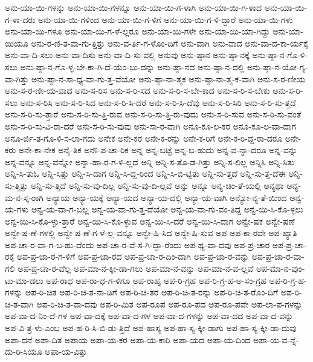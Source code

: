 {ಅನು-ಯಾ-ಯಿ-ಗಳನ್ನು
ಅನು-ಯಾ-ಯಿ-ಗಳನ್ನೂ
ಅನು-ಯಾ-ಯಿ-ಗ-ಳಾಗಿ
ಅನು-ಯಾ-ಯಿ-ಗ-ಳಾದ
ಅನು-ಯಾ-ಯಿ-ಗ-ಳಾ-ದರು
ಅನು-ಯಾ-ಯಿ-ಗಳಿಂದ
ಅನು-ಯಾ-ಯಿ-ಗ-ಳಿಗೆ
ಅನು-ಯಾ-ಯಿ-ಗ-ಳಿ-ದ್ದಾರೆ
ಅನು-ಯಾ-ಯಿ-ಗಳು
ಅನು-ಯಾ-ಯಿ-ಗಳೂ
ಅನು-ಯಾ-ಯಿ-ಗ-ಳೆ-ಲ್ಲರೂ
ಅನು-ಯಾ-ಯಿ-ಗಳೇ
ಅನು-ಯಾ-ಯಿ-ಯಾ-ಗಿದ್ದು
ಅನು-ಯಾ-ಯಿಯೂ
ಅನು-ರ-ಣಿ-ತ-ವಾ-ಗು-ತ್ತಿತ್ತು
ಅನು-ವ-ರ್ತಿ-ಗ-ಳೊಂ-ದಿಗೆ
ಅನು-ವಾಗಿ
ಅನು-ವಾದ
ಅನು-ವಾ-ದ-ಕಾ-ರ್ಯಕ್ಕೆ
ಅನು-ವಾ-ದಿ-ಸಲು
ಅನು-ವಾ-ದಿಸು
ಅನು-ವಾ-ದಿ-ಸು-ವಲ್ಲಿ
ಅನುವು
ಅನು-ಷ್ಠಾನ
ಅನು-ಷ್ಠಾ-ನಕ್ಕೆ
ಅನು-ಷ್ಠಾ-ನ-ಗೊ-ಳಿ-ಸಲು
ಅನು-ಷ್ಠಾ-ನ-ಗೊ-ಳ್ಳ-ಬೇ-ಕಾ-ಗಿ-ದೆ-ಯೆಂ-ಬು-ದನ್ನು
ಅನು-ಷ್ಠಾ-ನದ
ಅನು-ಷ್ಠಾ-ನ-ದಲ್ಲಿ
ಅನು-ಷ್ಠಾ-ನ-ಯೋ-ಗ್ಯ-ವಾ-ಗಿತ್ತು
ಅನು-ಷ್ಠಾ-ನ-ಸಾ-ಧ್ಯ-ವಾ-ಗು-ತ್ತ-ವೆಯೋ
ಅನು-ಷ್ಠಾ-ನಾ-ತ್ಮಕ
ಅನು-ಷ್ಠಾ-ನಾ-ತ್ಮ-ಕ-ವಾಗಿ
ಅನು-ಸ-ರ-ಣೀಯ
ಅನು-ಸ-ರ-ಣೀ-ಯ-ವಾದ
ಅನು-ಸ-ರಿಸ
ಅನು-ಸ-ರಿ-ಸದ
ಅನು-ಸ-ರಿ-ಸ-ಬೇ-ಕಾದ
ಅನು-ಸ-ರಿ-ಸ-ಬೇಕು
ಅನು-ಸ-ರಿ-ಸಲು
ಅನು-ಸ-ರಿಸಿ
ಅನು-ಸ-ರಿ-ಸಿದ
ಅನು-ಸ-ರಿ-ಸಿ-ದರೆ
ಅನು-ಸ-ರಿ-ಸಿ-ದೆವು
ಅನು-ಸ-ರಿ-ಸಿರಿ
ಅನು-ಸ-ರಿ-ಸು-ತ್ತದೆ
ಅನು-ಸ-ರಿ-ಸು-ತ್ತಾರೆ
ಅನು-ಸ-ರಿ-ಸು-ತ್ತಿ-ರುವ
ಅನು-ಸ-ರಿ-ಸು-ತ್ತಿ-ರು-ವುದು
ಅನು-ಸ-ರಿ-ಸುವ
ಅನು-ಸ-ರಿ-ಸು-ವಂತೆ
ಅನು-ಸ-ರಿ-ಸು-ವಿ-ರಾ-ದರೆ
ಅನು-ಸ-ರಿ-ಸು-ವುವು
ಅನು-ಸಾ-ರ-ವಾಗಿ
ಅನೂ-ಕೂ-ಲ-ಕರ
ಅನೂ-ಕೂ-ಲ-ವಾ-ದಾಗ
ಅನೂ-ರ್ಜಿ-ತ-ಗೊ-ಳಿ-ಸ-ಲಾ-ಗದು
ಅನೇಕ
ಅನೇ-ಕರ
ಅನೇ-ಕ-ರನ್ನು
ಅನೇ-ಕ-ರಿಗೆ
ಅನೇ-ಕ-ರಿ-ದ್ದ-ರಾ-ದರೂ
ಅನೇ-ಕರು
ಅನೇ-ಕಾ-ನೇಕ
ಅನೈ-ತಿಕ
ಅನೌ-ಪ-ಚಾ-ರಿಕ
ಅನ್ನ
ಅನ್ನ-ಬಟ್ಟೆ
ಅನ್ನ-ಬ-ಹುದು
ಅನ್ನ-ವ-ನ್ನಾ-ದರೂ
ಅನ್ನ-ವನ್ನು
ಅನ್ನ-ವನ್ನೂ
ಅನ್ನ-ವನ್ನೋ
ಅನ್ನಾ-ಹಾ-ರ-ಗ-ಳಿ-ಲ್ಲದೆ
ಅನ್ನಿ
ಅನ್ನಿ-ಸ-ತೊ-ಡ-ಗಿತ್ತು
ಅನ್ನಿ-ಸ-ಲಿಲ್ಲ
ಅನ್ನಿಸಿ
ಅನ್ನಿ-ಸಿತು
ಅನ್ನಿ-ಸಿ-ತುಓ
ಅನ್ನಿ-ಸಿತ್ತು
ಅನ್ನಿ-ಸಿ-ದಾಗ
ಅನ್ನಿ-ಸಿ-ದ್ದ-ರಿಂದ
ಅನ್ನಿ-ಸಿ-ಬಿ-ಟ್ಟಿತು
ಅನ್ನಿ-ಸು-ತ್ತದೆ
ಅನ್ನಿ-ಸು-ತ್ತ-ದೆಈ
ಅನ್ನಿ-ಸು-ತ್ತಿತ್ತು
ಅನ್ನಿ-ಸು-ತ್ತಿದೆ
ಅನ್ನಿ-ಸು-ವು-ದಿಲ್ಲ
ಅನ್ನಿ-ಸು-ವು-ದಿ-ಲ್ಲವೆ
ಅನ್ನು
ಅನ್ನೂ
ಅನ್ಯ-ಚಿಂ-ತೆ-ಯಲ್ಲಿ
ಅನ್ಯಥಾ
ಅನ್ಯ-ಮ-ನ-ಸ್ಕ-ರಾಗಿ
ಅನ್ಯಾಯ
ಅನ್ಯಾ-ಯಕ್ಕೆ
ಅನ್ಯಾ-ಯದ
ಅನ್ಯಾ-ಯ-ದಲ್ಲಿ
ಅನ್ಯಾ-ಯ-ವಾಗಿ
ಅನ್ಯೋ-ನ್ಯ-ತೆ-ಯಿಂದ
ಅನ್ವ-ಯ-ಗಳು
ಅನ್ವ-ಯ-ವಾ-ಗ-ಬಲ್ಲ
ಅನ್ವ-ಯ-ವಾ-ಗು-ತ್ತ-ದೆಯೋ
ಅನ್ವ-ಯ-ವಾ-ಗು-ವಂ-ತಿದ್ದ
ಅನ್ವ-ಯಿ-ಸಿ-ಕೊ-ಳ್ಳಲು
ಅನ್ವ-ಯಿ-ಸಿ-ಕೊ-ಳ್ಳು-ತ್ತಾರೆ
ಅನ್ವ-ಯಿ-ಸಿ-ಕೊ-ಳ್ಳುವ
ಅನ್ವ-ಯಿ-ಸಿ-ದರೆ
ಅನ್ವ-ಯಿ-ಸಿ-ದಾಗ
ಅನ್ವೇ-ಷಕ
ಅನ್ವೇ-ಷಣೆ
ಅನ್ವೇ-ಷ-ಣೆ-ಗಳಲ್ಲಿ
ಅನ್ವೇ-ಷ-ಣೆ-ಗ-ಳೆ-ಲ್ಲ-ವನ್ನೂ
ಅನ್ವೇ-ಷಿ-ಸಿದ
ಅನ್ವೇ-ಷಿ-ಸುವ
ಅಪ
ಅಪ-ಕಾ-ರವೇ
ಅಪ-ಖ್ಯಾತಿ
ಅಪ-ಚಾ-ರ-ವಾ-ಗ-ಬ-ಹು-ದೆಂದು
ಅಪ-ಚಾ-ರ-ವೆ-ಸ-ಗಿ-ದ್ದಾ-ರೆಂದು
ಅಪ-ಥ್ಯ-ವಾ-ದವು
ಅಪ-ಪ್ರ-ಚಾರ
ಅಪ-ಪ್ರ-ಚಾ-ರಕ್ಕೆ
ಅಪ-ಪ್ರ-ಚಾ-ರ-ಗ-ಳಿಗೆ
ಅಪ-ಪ್ರ-ಚಾ-ರದ
ಅಪ-ಪ್ರ-ಚಾ-ರ-ದಿಂ-ದಾಗಿ
ಅಪ-ಪ್ರ-ಚಾ-ರ-ವನ್ನು
ಅಪ-ಪ್ರ-ಚಾ-ರ-ವಾ-ಗಲಿ
ಅಪ-ಪ್ರ-ಚಾ-ರ-ವೆಲ್ಲ
ಅಪ-ಮಾ-ನ-ಕ್ಕೀ-ಡಾ-ಗಲು
ಅಪ-ಮಾ-ನ-ವನ್ನು
ಅಪ-ಮಾ-ನ-ವ-ಲ್ಲವೆ
ಅಪ-ಮಾ-ನ-ವುಂ-ಟು-ಮಾ-ಡಲು
ಅಪ-ರಾಧ
ಅಪ-ರಾ-ಧ-ಗ-ಳಿಗೂ
ಅಪ-ರಾಹ್ನ
ಅಪ-ರಿ-ಗ್ರಹ
ಅಪ-ರಿ-ಗ್ರ-ಹ-ಅ-ಸಂ-ಗ್ರಹ
ಅಪ-ರಿ-ಗ್ರ-ಹ-ಗಳನ್ನು
ಅಪ-ರಿ-ಚಿತ
ಅಪ-ರಿ-ಚಿ-ತ-ನಾ-ಡಿಗೆ
ಅಪ-ರಿ-ಚಿ-ತರ
ಅಪ-ರಿ-ಚಿ-ತ-ರನ್ನು
ಅಪ-ರಿ-ಚಿ-ತ-ರೊಂ-ದಿಗೆ
ಅಪ-ರಿ-ಚಿ-ತ-ವಾಗಿ
ಅಪ-ರಿ-ಚಿ-ತ-ವಾ-ದವು
ಅಪ-ರಿ-ಮಿತ
ಅಪ-ರೂಪ
ಅಪ-ರೂ-ಪದ
ಅಪ-ರೂ-ಪವೇ
ಅಪ-ಲಾ-ಪ-ಗಳನ್ನು
ಅಪ-ವಾ-ದ-ನಿಂ-ದೆ-ಗಳ
ಅಪ-ವಾ-ದಕ್ಕೆ
ಅಪ-ವಾ-ದ-ಗಳ
ಅಪ-ವಾ-ದ-ಗಳನ್ನು
ಅಪ-ವಾ-ದದ
ಅಪ-ವಾ-ದ-ವನ್ನು
ಅಪ-ವಿ-ತ್ರ-ಳು-ಎಂಬ
ಅಪ-ಹ-ರಿ-ಸಿ-ಬಿ-ಡು-ತ್ತಿದೆ
ಅಪ-ಹಾಸ್ಯ
ಅಪ-ಹಾ-ಸ್ಯ-ಕ್ಕೀ-ಡಾಗು
ಅಪ-ಹಾ-ಸ್ಯ-ಕ್ಕೀ-ಡಾ-ದುವು
ಅಪಾ-ದನೆ
ಅಪಾ-ದಿತ
ಅಪಾಯ
ಅಪಾ-ಯ-ಕರ
ಅಪಾ-ಯ-ಕಾರಿ
ಅಪಾ-ಯದ
ಅಪಾ-ಯ-ದಿಂದ
ಅಪಾ-ಯ-ವ-ನ್ನೆ-ದು-ರಿ-ಸಿಯೂ
ಅಪಾ-ಯ-ವಿತ್ತು
}

